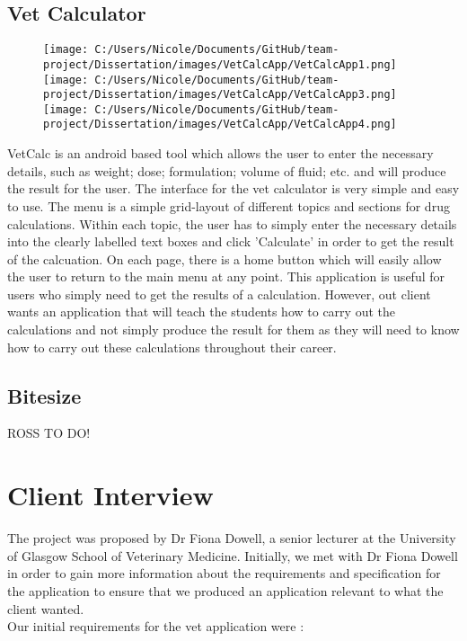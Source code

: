 \documentclass{l3proj}
\begin{document}
\subsection{Vet Calculator}

\begin{figure}[!htb]
  \texttt{[image: C:/Users/Nicole/Documents/GitHub/team-project/Dissertation/images/VetCalcApp/VetCalcApp1.png]}
\endminipage\hfill
{}
  \texttt{[image: C:/Users/Nicole/Documents/GitHub/team-project/Dissertation/images/VetCalcApp/VetCalcApp3.png]}
\endminipage\hfill
{}%
  \texttt{[image: C:/Users/Nicole/Documents/GitHub/team-project/Dissertation/images/VetCalcApp/VetCalcApp4.png]}
\endminipage
\end{figure}

VetCalc is an android based tool which allows the user to enter the necessary details, such as weight; dose; formulation; volume of fluid; etc. and will produce the result for the user. The interface for the vet calculator is very simple and easy to use. The menu is a simple grid-layout of different topics and sections for drug calculations. Within each topic, the user has to simply enter the necessary details into the clearly labelled text boxes and click 'Calculate' in order to get the result of the calcuation. On each page, there is a home button which will easily allow the user to return to the main menu at any point. This application is useful for users who simply need to get the results of a calculation. However, out client wants an application that will teach the students how to carry out the calculations and not simply produce the result for them as they will need to know how to carry out these calculations throughout their career.

\subsection{Bitesize}

ROSS TO DO!

\section{Client Interview}

The project was proposed by Dr Fiona Dowell, a senior lecturer at the University of Glasgow School of Veterinary Medicine. Initially, we met with Dr Fiona Dowell in order to gain more information about the requirements and specification for the application to ensure that we produced an application relevant to what the client wanted.\\
Our initial requirements for the vet application were :
\end{document}
